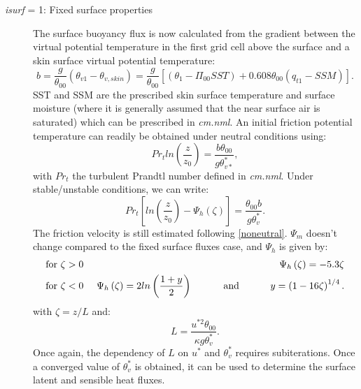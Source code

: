 \documentclass[12pt,A4,french]{article}
\begin{document}
\begin{description}
\item[{\it isurf} = 1: Fixed surface properties]
The surface buoyancy flux is now calculated from the gradient between the virtual 
potential temperature in the first grid cell above the surface and a skin surface virtual potential temperature:
\begin{equation}
b = \frac{g}{\theta_{00}}\left(\theta_{v1} - \theta_{v,skin}\right) = \frac{g}{\theta_{00}}\left[\left(\theta_{1} - \Pi_{00} SST\right) + 0.608 \theta_{00}\left(q_{t1} - SSM\right)\right].
\end{equation}
SST and SSM are the prescribed skin surface temperature and surface moisture (where it is generally assumed that the near surface air is saturated) which can be prescribed in {\it cm.nml}. An initial friction potential temperature can readily be obtained under neutral conditions using:
\begin{equation}
Pr_{t} ln\left(\frac{z}{z_{0}}\right) = \frac{b \theta_{00}}{g \theta^{*}_{v*}},
\end{equation}
with $Pr_{t}$ the turbulent Prandtl number defined in {\it cm.nml}. Under stable/unstable conditions, we can write:
\begin{equation}
Pr_{t}\left[ln\left(\frac{z}{z_{0}}\right) - \Psi_{h}\left(\zeta\right)\right] = \frac{\theta_{00} b}{g \theta^{*}_{v}}.
\end{equation}
The friction velocity is still estimated following \ref{noneutral}. $\Psi_{m}$ doesn't change compared to the fixed surface fluxes case, and $\Psi_{h}$ is given by:
\begin{eqnarray}
\mbox{for } \zeta > 0 & \mbox{      } & \Psi_{h}\left(\zeta\right) = -5.3\zeta \\
\mbox{for } \zeta < 0 & \mbox{      } & \Psi_{h}\left(\zeta\right) = 2 ln\left(\frac{1+y}{2}\right) \mbox{\hspace{1cm} and \hspace{1cm}} y = \left(1 - 16\zeta\right)^{1/4}.
\end{eqnarray}
with $\zeta = z/L$ and:
\begin{equation}
L = \frac{u^{*2} \theta_{00}}{\kappa g \theta^{*}_{v}}.
\end{equation}
Once again, the dependency of $L$ on $u^{*}$ and $\theta^{*}_{v}$ requires subiterations. Once a converged value of $\theta^{*}_{v}$ is obtained, it can be used to determine the surface latent and sensible heat fluxes.


\end{description}
\end{document}
